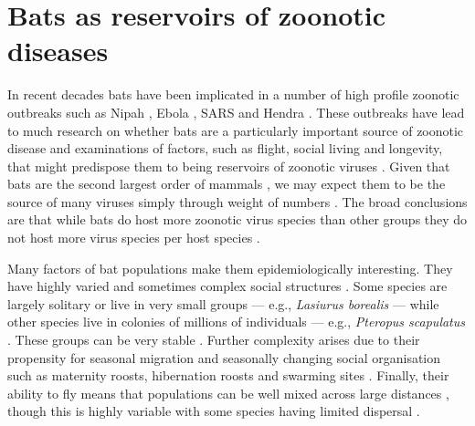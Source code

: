 \section{Bats as reservoirs of zoonotic diseases}


In recent decades bats have been implicated in a number of high profile zoonotic outbreaks such as Nipah \cite{field2001natural, halpin2011pteropid}, Ebola \cite{leroy2005fruit}, SARS \cite{li2005bats} and Hendra \cite{field2001natural}.
These outbreaks have lead to much research on whether bats are a particularly important source of zoonotic disease \cite{luis2013comparison, olival2015bats, wang2011mass} and examinations of factors, such as flight, social living and longevity, that might predispose them to being reservoirs of zoonotic viruses \cite{calisher2006bats, o2014bat, dobson2005links, racey2015uniqueness, kuzmin2011bats}.
Given that bats are the second largest order of mammals \cite{wilson2005mammal}, we may expect them to be the source of many viruses simply through weight of numbers \cite{luis2013comparison}.
The broad conclusions are that while bats do host more zoonotic virus species than other groups \cite{luis2013comparison} they do not host more virus species per host species \cite{olival2015bats}.


Many factors of bat populations make them epidemiologically interesting.
They have highly varied and sometimes complex social structures \cite{kerth2008causes}.
Some species are largely solitary or live in very small groups --- e.g., \emph{Lasiurus borealis} \cite{shump1982lasiurus} --- while other species live in colonies of millions of individuals --- e.g., \emph{Pteropus scapulatus} \cite{birt2008little}.
These groups can be very stable \cite{kerth2011bats, mccracken1981social}.
Further complexity arises due to their propensity for seasonal migration \cite{fleming2003ecology, richter2008first, cryan2014continental} and seasonally changing social organisation such as maternity roosts, hibernation roosts and swarming sites \cite{kerth2008causes}.
Finally, their ability to fly means that populations can be well mixed across large distances \cite{peel2013continent, petit1999male}, though this is highly variable with some species having limited dispersal \cite{wilmer1994extreme}.

